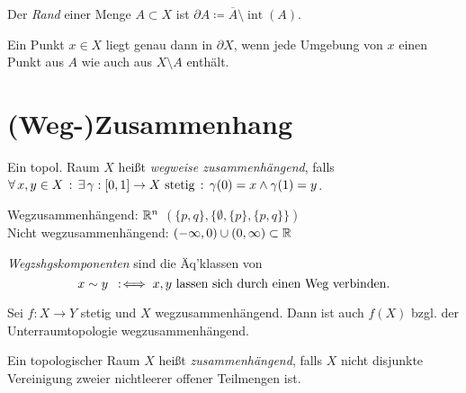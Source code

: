 \documentclass{cheat-sheet}
\DeclareMathOperator{\inte}{int} %
\newcommand{\inlineitem}[1]{\textbullet \enspace #1} %
\begin{document}
\begin{samepage}

\begin{defn}
  Der \emph{Rand} einer Menge $A \subset X$ ist $\partial A \coloneqq \overline{A} \setminus \inte(A)$.
\end{defn}

\begin{prop}
  Ein Punkt $x \in X$ liegt genau dann in $\partial X$, wenn jede Umgebung von $x$ einen Punkt aus $A$ wie auch aus $X \setminus A$ enthält.
\end{prop}


\section{(Weg-)Zusammenhang}

\end{samepage}

\begin{defn}
  Ein topol. Raum $X$ heißt \emph{wegweise zusammenhängend}, falls
  $\forall \, {x, y \in X} \,:\, \exists \, {\gamma : \left[ 0, 1 \right] \to X \text{ stetig}} \,:\, \gamma(0) = x \wedge \gamma(1) = y$.
\end{defn}

\begin{bspe}
  Wegzusammenhängend: \enspace
  \inlineitem{$\mathbb{R}^n$} \enspace
  \inlineitem{$(\{ p, q \}, \{ \emptyset, \{ p \}, \{ p, q \} \})$} \\
  Nicht wegzusammenhängend: \enspace
  \inlineitem{$\left( -\infty, 0 \right) \cup \left( 0, \infty \right) \subset \mathbb{R}$}
\end{bspe}

\begin{defn}
  \emph{Wegzshgskomponenten} sind die Äq'klassen von
  \[ x \sim y \enspace:\!\iff x, y \text{ lassen sich durch einen Weg verbinden}. \]
\end{defn}

\begin{prop}
  Sei $f : X \to Y$ stetig und $X$ wegzusammenhängend. Dann ist auch $f(X)$ bzgl. der Unterraumtopologie wegzusammenhängend.
\end{prop}

\begin{defn}
  Ein topologischer Raum $X$ heißt \emph{zusammenhängend}, falls $X$ nicht disjunkte Vereinigung zweier nichtleerer offener Teilmengen ist.
\end{defn}
\end{document}
